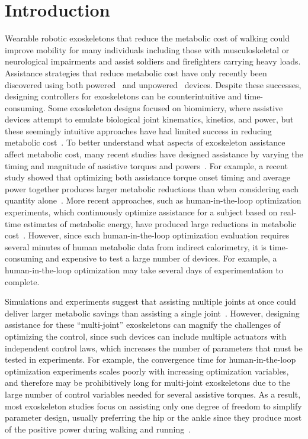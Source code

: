 \documentclass[10pt,letterpaper]{article}
\begin{document}
\section*{Introduction}
Wearable robotic exoskeletons that reduce the metabolic cost of walking could improve mobility for many individuals including those with musculoskeletal or neurological impairments and assist soldiers and firefighters carrying heavy loads. Assistance strategies that reduce metabolic cost have only recently been discovered using both powered~\cite{Sawicki:2008, Malcolm:2013, Mooney:2014, Sawicki:2020} and unpowered~\cite{Collins:2015} devices. Despite these successes, designing controllers for exoskeletons can be counterintuitive and time-consuming. Some exoskeleton designs focused on biomimicry, where assistive devices attempt to emulate biological joint kinematics, kinetics, and power, but these seemingly intuitive approaches have had limited success in reducing metabolic cost~\cite{vanDijk:2011, Cornwall:2015}. To better understand what aspects of exoskeleton assistance affect metabolic cost, many recent studies have designed assistance by varying the timing and magnitude of assistive torques and powers~\cite{Zhang:2017, Ding:2016, Ding:2018, Galle:2017, Quinlivan:2017}. For example, a recent study showed that optimizing both assistance torque onset timing and average power together produces larger metabolic reductions than when considering each quantity alone~\cite{Galle:2017}. More recent approaches, such as human-in-the-loop optimization experiments, which continuously optimize assistance for a subject based on real-time estimates of metabolic energy, have produced large reductions in metabolic cost~\cite{Zhang:2017, Ding:2018}. However, since each human-in-the-loop optimization evaluation requires several minutes of human metabolic data from indirect calorimetry, it is time-consuming and expensive to test a large number of devices. For example, a human-in-the-loop optimization may take several days of experimentation to complete.

Simulations and experiments suggest that assisting multiple joints at once could deliver larger metabolic savings than assisting a single joint~\cite{Uchida:2016, Quinlivan:2017, Malcolm:2018, Bryan:2020}. However, designing assistance for these ``multi-joint'' exoskeletons can magnify the challenges of optimizing the control, since such devices can include multiple actuators with independent control laws, which increases the number of parameters that must be tested in experiments. For example, the convergence time for human-in-the-loop optimization experiments scales poorly with increasing optimization variables, and therefore may be prohibitively long for multi-joint exoskeletons due to the large number of control variables needed for several assistive torques. As a result, most exoskeleton studies focus on assisting only one degree of freedom to simplify parameter design, usually preferring the hip or the ankle since they produce most of the positive power during walking and running~\cite{Winter:1991, Novacheck:1998, Farris:2012, Sawicki:2020}. 
\end{document}
